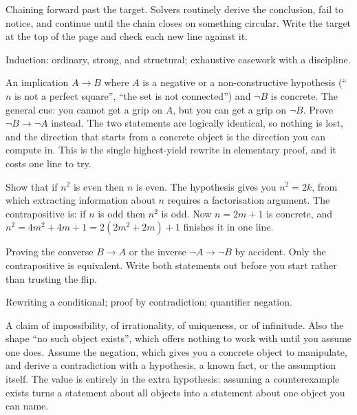 \begin{trap}
Chaining forward past the target. Solvers routinely derive the conclusion, fail to notice, and continue until the chain closes on something circular. Write the target at the top of the page and check each new line against it.
\end{trap}

\begin{seealsob}Induction: ordinary, strong, and structural; exhaustive casework with a discipline.\end{seealsob}

\cue An implication $A\to B$ where $A$ is a negative or a non-constructive hypothesis (``$n$ is not a perfect square'', ``the set is not connected'') and $\lnot B$ is concrete. The general cue: you cannot get a grip on $A$, but you can get a grip on $\lnot B$.
\method Prove $\lnot B\to\lnot A$ instead. The two statements are logically identical, so nothing is lost, and the direction that starts from a concrete object is the direction you can compute in. This is the single highest-yield rewrite in elementary proof, and it costs one line to try.

\begin{worked}
Show that if $n^{2}$ is even then $n$ is even. The hypothesis gives you $n^{2}=2k$, from which extracting information about $n$ requires a factorisation argument. The contrapositive is: if $n$ is odd then $n^{2}$ is odd. Now $n=2m+1$ is concrete, and $n^{2}=4m^{2}+4m+1=2(2m^{2}+2m)+1$ finishes it in one line.
\end{worked}

\begin{trap}
Proving the converse $B\to A$ or the inverse $\lnot A\to\lnot B$ by accident. Only the contrapositive is equivalent. Write both statements out before you start rather than trusting the flip.
\end{trap}

\begin{seealsob}Rewriting a conditional; proof by contradiction; quantifier negation.\end{seealsob}

\cue A claim of impossibility, of irrationality, of uniqueness, or of infinitude. Also the shape ``no such object exists'', which offers nothing to work with until you assume one does.
\method Assume the negation, which gives you a concrete object to manipulate, and derive a contradiction with a hypothesis, a known fact, or the assumption itself. The value is entirely in the extra hypothesis: assuming a counterexample exists turns a statement about all objects into a statement about one object you can name.

